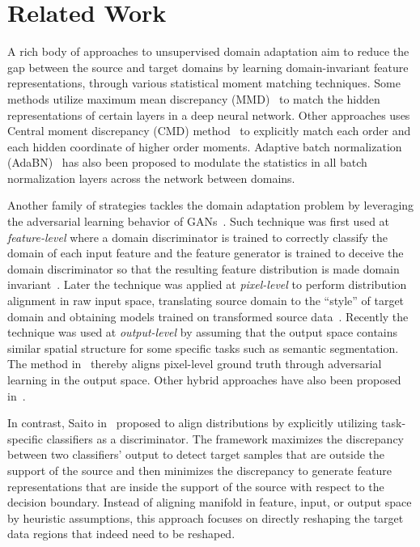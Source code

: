 \documentclass[10pt,twocolumn,letterpaper]{article}
\begin{document}
\section{Related Work}
A rich body of approaches to unsupervised domain adaptation aim to reduce the gap between the source and target domains by learning domain-invariant feature representations, through various statistical moment matching techniques. Some methods utilize maximum mean discrepancy (MMD)~\cite{long2015learning, long2016unsupervised} to match the hidden representations of certain layers in a deep neural network. Other approaches uses Central moment discrepancy (CMD) method~\cite{zellinger2017central} to explicitly match each order and each hidden coordinate of higher order moments. Adaptive batch normalization (AdaBN)~\cite{li2018adaptive} has also been proposed to modulate the statistics in all batch normalization layers across the network between domains.

Another family of strategies tackles the domain adaptation problem by leveraging the adversarial learning behavior of GANs~\cite{goodfellow2014generative}. Such technique was first used at \textit{feature-level} where a domain discriminator is trained to correctly classify the domain of each input feature and the feature generator is trained to deceive the domain discriminator so that the resulting feature distribution is made domain invariant~\cite{tzeng2014deep, hoffman2016fcns, ganin2016domain}. Later the technique was applied at \textit{pixel-level} to perform distribution alignment in raw input space, translating source domain to the ``style'' of target domain and obtaining models trained on transformed source data~\cite{liu2016coupled, tzeng2017adversarial, bousmalis2017unsupervised, shrivastava2017learning, hoffman2017cycada, sankaranarayanan2017generate, murez2018image}. Recently the technique was used at \textit{output-level} by assuming that the output space contains similar spatial structure for some specific tasks such as semantic segmentation. The method in~\cite{tsai2018learning} thereby aligns pixel-level ground truth through adversarial learning in the output space. Other hybrid approaches have also been proposed in~\cite{sankaranarayanan2018learning, huang2018domain}.

In contrast, Saito \etal in~\cite{saito2017maximum} proposed to align distributions by explicitly utilizing task-specific classifiers as a discriminator. The framework maximizes the discrepancy between two classifiers' output to detect target samples that are outside the support of the source and then minimizes the discrepancy to generate feature representations that are inside the support of the source with respect to the decision boundary. Instead of aligning manifold in feature, input, or output space by heuristic assumptions, this approach focuses on directly reshaping the target data regions that indeed need to be reshaped.
\end{document}

